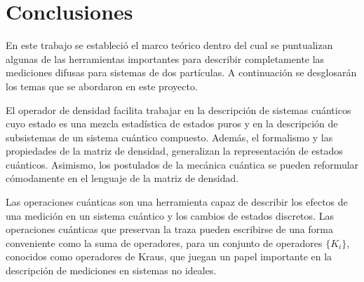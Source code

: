 \chapter{Conclusiones }

En este trabajo se estableció el marco teórico dentro del cual se puntualizan
algunas de las herramientas importantes para describir completamente las
mediciones difusas para sistemas de dos partículas. A continuación se
desglosarán los temas que se abordaron en este proyecto. 

El operador de densidad facilita trabajar en la descripción de sistemas cuánticos cuyo estado es una mezcla estadística de estados puros y en la descripción de subsistemas de un sistema cuántico compuesto. Además, el formalismo y las propiedades de la matriz de densidad, generalizan la representación de estados cuánticos. Asimismo, los postulados de la mecánica cuántica se pueden reformular cómodamente en el lenguaje de la matriz de densidad.

Las operaciones cuánticas %
son una herramienta 
capaz de describir los efectos de una medición en un sistema cuántico y los cambios
de estados discretos. 
Las operaciones cuánticas que preservan la traza pueden escribirse de una forma conveniente como la suma de operadores, para un conjunto de operadores $\{K_i\}$, conocidos como operadores de Kraus, que juegan un papel importante en la descripción de mediciones en sistemas no ideales. 

